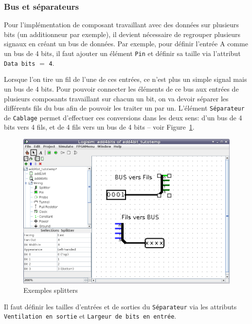 \documentclass{article}
\begin{document}
    \subsubsection{Bus et séparateurs}

    Pour l'implémentation de composant travaillant avec des données sur plusieurs bits (un additionneur par exemple),
    il devient nécessaire de regrouper plusieurs signaux en créant un bus de données.
    Par exemple, pour définir l'entrée A comme un bus de 4 bits, il
    faut ajouter un élément \texttt{Pin} et définir sa taille via l'attribut \texttt{Data bits} $=$ \texttt{4}.

    Lorsque l'on tire un fil de l'une de ces entrées, ce n'est plus un simple signal mais un bus de 4 bits.
    Pour
    pouvoir connecter les éléments de ce bus aux entrées de plusieurs composants travaillant sur chacun un bit,
    on va devoir séparer les différents fils du bus afin de pouvoir les traiter un par un.
    L'élément \texttt{Séparateur}
    de \texttt{Cablage} permet d'effectuer ces conversions dans les deux sens: d'un bus de 4 bits vers 4 fils,
    et de 4 fils vers un bus de 4 bits -- voir Figure~\ref{fig_splitter}.

    \begin{figure}[H]
        \begin{center}
            \includegraphics[width=500pt]{pictures/logisim_splitters.png}
            \caption{\label{fig_splitter}Exemples splitters}
        \end{center}
    \end{figure}

    Il faut définir les tailles d'entrées et de sorties du \texttt{Séparateur} via les attributs \texttt{Ventilation en sortie} et
    \texttt{Largeur de bits en entrée}.
\end{document}
